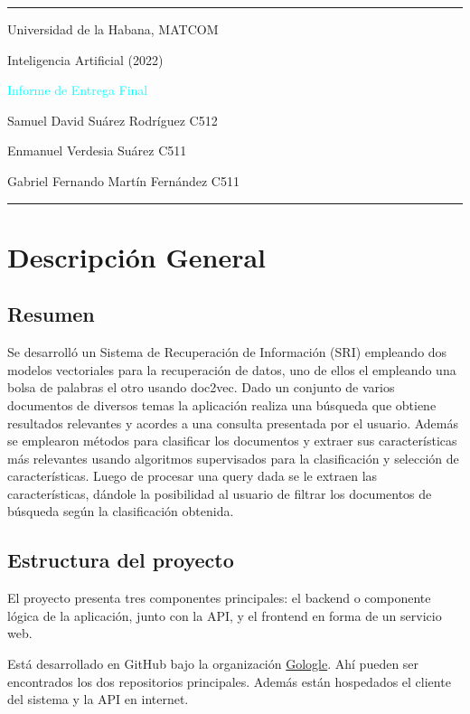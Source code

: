 \documentclass[12pt]{llncs}
\begin{document}
\begin{center}
\large{
\rule{\textwidth}{0.5pt}
\par Universidad de la Habana, MATCOM
\par Inteligencia Artificial (2022)
\vspace{0.4cm}
\par \textcolor{cyan}{Informe de Entrega Final}
\par Samuel David Suárez Rodríguez C512
\par Enmanuel Verdesia Suárez C511
\par Gabriel Fernando Martín Fernández C511
\rule{\textwidth}{1.5pt}
}

\end{center}

\section{Descripción General}
\vspace{0.5cm}
\subsection{Resumen}
\par Se desarrolló un Sistema de Recuperación de Información (SRI) empleando dos modelos vectoriales para la recuperación de datos, uno de ellos el empleando una bolsa de palabras el otro usando doc2vec. Dado un conjunto de varios documentos de diversos temas la aplicación realiza una búsqueda que obtiene resultados relevantes y acordes a una consulta presentada por el usuario. Además se emplearon métodos para clasificar los documentos y extraer sus características más relevantes usando algoritmos supervisados para la clasificación y selección de características. Luego de procesar una query dada se le extraen las características, dándole la posibilidad al usuario de filtrar los documentos de búsqueda según la clasificación obtenida.

\subsection{Estructura del proyecto}
\par El proyecto presenta tres componentes principales: el backend o componente lógica de la aplicación, junto con la API, y el frontend en forma de un servicio web.

Está desarrollado en GitHub bajo la organización \href{https://github.com/Gologle}{\color{blue}Gologle}. Ahí pueden ser encontrados los dos repositorios principales. Además están hospedados el cliente del sistema y la API en internet.
\end{document}
